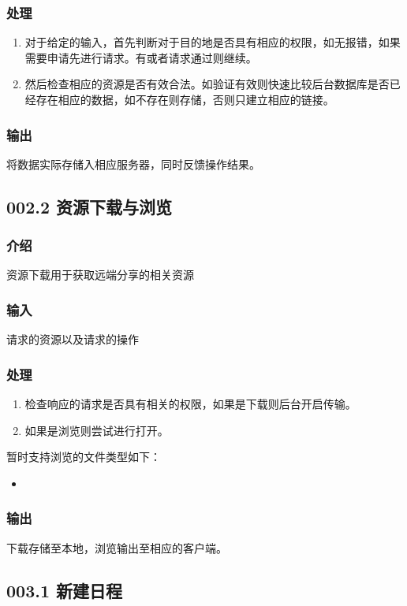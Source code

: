     \subsubsection{处理}
    \begin{enumerate}
      \item 对于给定的输入，首先判断对于目的地是否具有相应的权限，如无报错，如果需要申请先进行请求。有或者请求通过则继续。
      \item 然后检查相应的资源是否有效合法。如验证有效则快速比较后台数据库是否已经存在相应的数据，如不存在则存储，否则只建立相应的链接。
    \end{enumerate}
    \subsubsection{输出}
    将数据实际存储入相应服务器，同时反馈操作结果。

  \subsection{002.2 资源下载与浏览}
    \subsubsection{介绍}
    资源下载用于获取远端分享的相关资源
    \subsubsection{输入}
    请求的资源以及请求的操作
    \subsubsection{处理}
    \begin{enumerate}
      \item 检查响应的请求是否具有相关的权限，如果是下载则后台开启传输。
      \item 如果是浏览则尝试进行打开。
    \end{enumerate}
    暂时支持浏览的文件类型如下：
    \begin{itemize}
      \item
    \end{itemize}
    \subsubsection{输出}
    下载存储至本地，浏览输出至相应的客户端。

  \subsection{003.1 新建日程}
